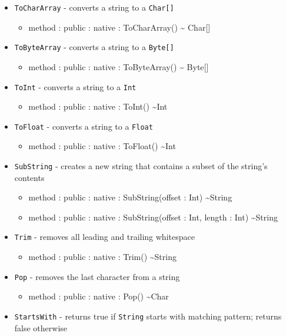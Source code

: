 \documentclass[11pt]{article}
\begin{document}
\begin{itemize}
\item \texttt{ToCharArray} - converts a string to a \texttt{Char[]}
  \begin{itemize}
  \item method : public : native : ToCharArray() \textasciitilde
    Char[]
  \end{itemize}
\item \texttt{ToByteArray} - converts a string to a \texttt{Byte[]}
  \begin{itemize}
  \item method : public : native : ToByteArray() \textasciitilde
    Byte[]
  \end{itemize}
\item \texttt{ToInt} - converts a string to a \texttt{Int}
  \begin{itemize}
  \item method : public : native : ToInt() \textasciitilde Int
  \end{itemize}
\item \texttt{ToFloat} - converts a string to a \texttt{Float}
  \begin{itemize}
  \item method : public : native : ToFloat() \textasciitilde Int
  \end{itemize}
\item \texttt{SubString} - creates a new string that contains a subset
  of the string's contents
  \begin{itemize}
  \item method : public : native : SubString(offset : Int)
    \textasciitilde String
  \item method : public : native : SubString(offset : Int, length :
    Int) \textasciitilde String
  \end{itemize}
\item \texttt{Trim} - removes all leading and trailing whitespace
  \begin{itemize}
  \item method : public : native : Trim() \textasciitilde String
  \end{itemize}
\item \texttt{Pop} - removes the last character from a string
  \begin{itemize}
  \item method : public : native : Pop() \textasciitilde Char
  \end{itemize}
\item \texttt{StartsWith} - returns true if \texttt{String} starts
  with matching pattern; returns false otherwise

\end{itemize}
\end{document}
